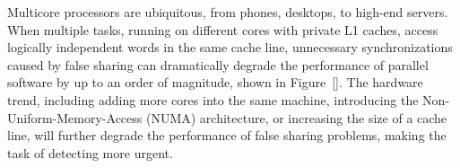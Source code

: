 Multicore processors are ubiquitous, from phones, desktops, to high-end servers.
When multiple tasks, running on different cores with private L1 caches, access logically independent words in the same cache line, unnecessary synchronizations caused by false sharing can dramatically degrade the performance of parallel software by up to an order of magnitude, shown in Figure~\ref{}. The hardware trend, including adding more cores into the same machine, introducing the Non-Uniform-Memory-Access (NUMA) architecture, or increasing the size of a cache line, will further degrade the performance of false sharing problems, making the task of detecting more urgent. 


